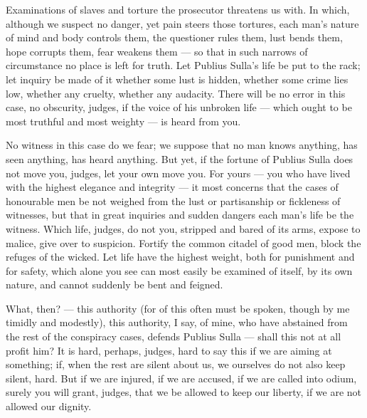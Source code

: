  Examinations of slaves and torture the prosecutor threatens us with. In which, although we suspect no danger, yet pain steers those tortures, each man's nature of mind and body controls them, the questioner rules them, lust bends them, hope corrupts them, fear weakens them --- so that in such narrows of circumstance no place is left for truth. Let Publius Sulla's life be put to the rack; let inquiry be made of it whether some lust is hidden, whether some crime lies low, whether any cruelty, whether any audacity. There will be no error in this case, no obscurity, judges, if the voice of his unbroken life --- which ought to be most truthful and most weighty --- is heard from you.

 No witness in this case do we fear; we suppose that no man knows anything, has seen anything, has heard anything. But yet, if the fortune of Publius Sulla does not move you, judges, let your own move you. For yours --- you who have lived with the highest elegance and integrity --- it most concerns that the cases of honourable men be not weighed from the lust or partisanship or fickleness of witnesses, but that in great inquiries and sudden dangers each man's life be the witness. Which life, judges, do not you, stripped and bared of its arms, expose to malice, give over to suspicion. Fortify the common citadel of good men, block the refuges of the wicked. Let life have the highest weight, both for punishment and for safety, which alone you see can most easily be examined of itself, by its own nature, and cannot suddenly be bent and feigned.

 What, then? --- this authority (for of this often must be spoken, though by me timidly and modestly), this authority, I say, of mine, who have abstained from the rest of the conspiracy cases, defends Publius Sulla --- shall this not at all profit him? It is hard, perhaps, judges, hard to say this if we are aiming at something; if, when the rest are silent about us, we ourselves do not also keep silent, hard. But if we are injured, if we are accused, if we are called into odium, surely you will grant, judges, that we be allowed to keep our liberty, if we are not allowed our dignity.

